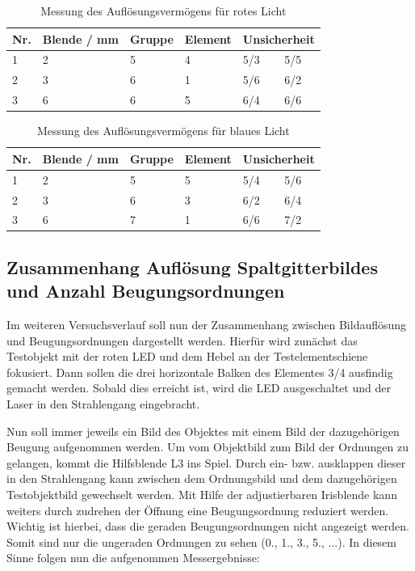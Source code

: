 \documentclass[12pt,a4paper,twoside]{article}
\begin{document}
\begin{table}[H]
    \centering
    \caption{Messung des Auflösungsvermögens für rotes Licht}
    \label{tab:MessungenAuflösungsvermögenRot}
    \begin{tabular}{| l | l | l | l | l | l |}
        \hline
        Nr. & Blende / mm & Gruppe & Element & \multicolumn{2}{|c|}{Unsicherheit} \\
        \hline
        1 & 2 & 5 & 4 & 5/3 & 5/5 \\
        2 & 3 & 6 & 1 & 5/6 & 6/2 \\
        3 & 6 & 6 & 5 & 6/4 & 6/6 \\
        \hline
    \end{tabular}
\end{table}

\begin{table}[H]
    \centering
    \caption{Messung des Auflösungsvermögens für blaues Licht}
    \label{tab:MessungenAuflösungsvermögenBlau}
    \begin{tabular}{| l | l | l | l | l | l |}
        \hline
        Nr. & Blende / mm & Gruppe & Element & \multicolumn{2}{|c|}{Unsicherheit} \\
        \hline
        1 & 2 & 5 & 5 & 5/4 & 5/6 \\
        2 & 3 & 6 & 3 & 6/2 & 6/4 \\
        3 & 6 & 7 & 1 & 6/6 & 7/2 \\
        \hline
    \end{tabular}
\end{table}




\subsection{Zusammenhang Auflösung Spaltgitterbildes und Anzahl Beugungsordnungen}

Im weiteren Versuchsverlauf soll nun der Zusammenhang zwischen Bildauflösung und Beugungsordnungen dargestellt werden. 
Hierfür wird zunächst das Testobjekt mit der roten LED und dem Hebel an der Testelementschiene fokusiert. Dann sollen die drei horizontale Balken des Elementes 3/4 ausfindig gemacht werden.
Sobald dies erreicht ist, wird die LED ausgeschaltet und der Laser in den Strahlengang eingebracht. \newline

\noindent
Nun soll immer jeweils ein Bild des Objektes mit einem Bild der dazugehörigen Beugung aufgenommen werden.
Um vom Objektbild zum Bild der Ordnungen zu gelangen, kommt die Hilfsblende L3 ins Spiel. Durch ein- bzw. ausklappen dieser in den Strahlengang kann zwischen dem Ordnungsbild und dem dazugehörigen Testobjektbild gewechselt werden.
Mit Hilfe der adjustierbaren Irisblende kann weiters durch zudrehen der Öffnung eine Beugungsordnung reduziert werden. Wichtig ist hierbei, dass die geraden Beugungsordnungen nicht angezeigt werden.
Somit sind nur die ungeraden Ordnungen zu sehen (0., 1., 3., 5., ...). In diesem Sinne folgen nun die aufgenommen Messergebnisse:
\end{document}
